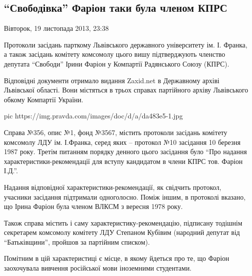  
 
 
 
 
 
\subsection{\enquote{Свободівка} Фаріон таки була членом КПРС}
\label{sec:19_11_2013.news.ua.pravda.1.farion_kpss}

Вівторок, 19 листопада 2013, 23:38

Протоколи засідань парткому Львівського державного університету ім. І. Франка,
а також засідань комітету комсомолу цього вишу підтверджують членство депутата
\enquote{Свободи} Ірини Фаріон у Компартії Радянського Союзу (КПРС).

Відповідні документи отримало видання Zaxid.net в Державному архіві Львівської
області. Вони містяться в трьох справах партійного архіву Львівського обкому
Компартії України.

\ifcmt
pic https://img.pravda.com/images/doc/d/a/da483e5-1.jpg
\fi

Справа №356, опис №1, фонд №3567, містить протоколи засідань комітету комсомолу
ЛДУ ім. І.Франка, серед яких – протокол №10 засідання 10 березня 1987 року.
Третім питанням порядку денного цього засідання було \enquote{Про надання
характеристики-рекомендації для вступу кандидатом в члени КПРС тов. Фаріон
І.Д.}.

Надання відповідної характеристики-рекомендації, як свідчить протокол, учасники
засідання підтримали одноголосно. Поміж іншим, в протоколі вказано, що Ірина
Фаріон була членом ВЛКСМ з вересня 1978 року.

Також справа містить і саму характеристику-рекомендацію, підписану тодішнім
секретарем комсомолу комітету ЛДУ Степаном Кубівим (народний депутат від
\enquote{Батьківщини}, пройшов за партійним списком).

Помітним в цій характеристиці є місце, в якому йдеться про те, що Фаріон
заохочувала вивчення російської мови іноземними студентами.

